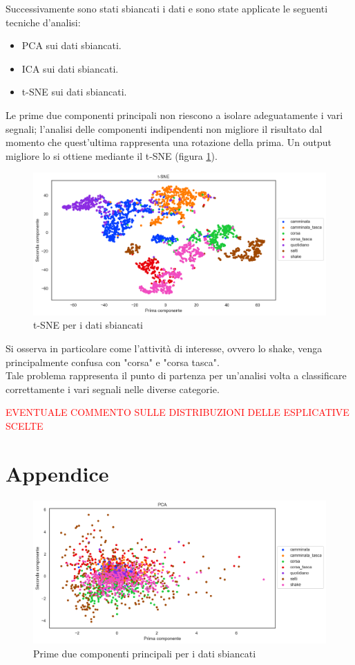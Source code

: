 \documentclass[./main.tex]{subfiles}
\begin{document}
Successivamente sono stati sbiancati i dati e sono state applicate le seguenti tecniche d'analisi:
\begin{itemize}
	\item PCA sui dati sbiancati.
	\item ICA sui dati sbiancati.
	\item t-SNE sui dati sbiancati.
\end{itemize}
Le prime due componenti principali non riescono a isolare adeguatamente i vari segnali; l'analisi delle componenti indipendenti non migliore il risultato dal momento che quest'ultima rappresenta una rotazione della prima. Un output migliore lo si ottiene mediante il t-SNE (figura \ref{t-sne}). 
\begin{figure}[H]
	\centering
	\includegraphics[width=.8\textwidth, keepaspectratio]{../../figure/t-SNE.png}
	\caption{{ t-SNE per i dati sbiancati}}
	\label{t-sne}
\end{figure}
Si osserva in particolare come l'attività di interesse, ovvero lo shake, venga principalmente confusa con "corsa" e "corsa tasca". 
\\
Tale problema rappresenta il punto di partenza per un'analisi volta a classificare correttamente i vari segnali nelle diverse categorie.

\textcolor{red}{EVENTUALE COMMENTO SULLE DISTRIBUZIONI DELLE ESPLICATIVE SCELTE}

\section{Appendice}
\begin{figure}[H]
	\centering
	\includegraphics[width=.8\textwidth, keepaspectratio]{../../figure/PCA.png}
	\caption{{ Prime due componenti principali per i dati sbiancati}}
	\label{PCA}
\end{figure}
\end{document}
